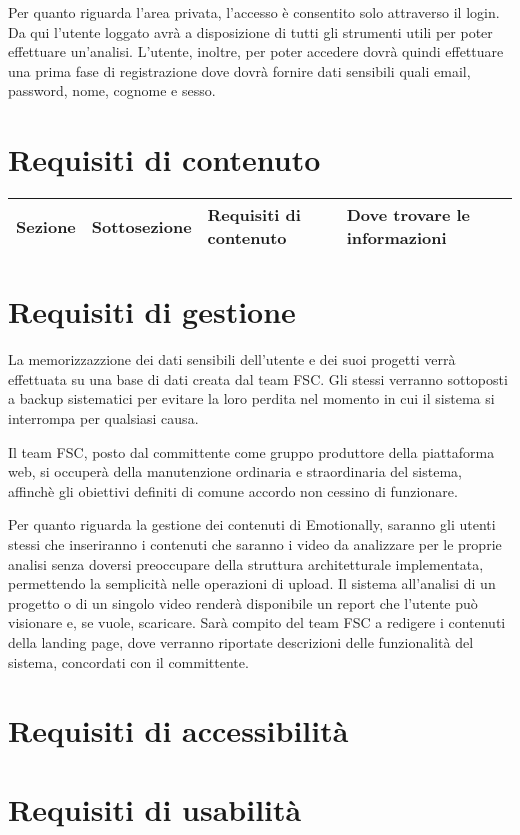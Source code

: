 Per quanto riguarda l'area privata, l'accesso è consentito solo attraverso il 
login. Da qui l'utente loggato avrà a disposizione di tutti gli strumenti utili 
per poter effettuare un'analisi. L'utente, inoltre, per poter accedere dovrà 
quindi effettuare una prima fase di registrazione dove dovrà fornire dati 
sensibili quali email, password, nome, cognome e sesso.

\section{Requisiti di contenuto}\label{sec:requisiti-di-contenuto}

\begin{table}[H]
	\centering
	\caption{I bisogni degli utenti di Emotionally.}
	\label{tab:bisogni-utenti}
	\begin{longtable}{@{}|>{\centering\arraybackslash}m{}|m{}|m{}|>{\centering\arraybackslash}m{}|@{}}
		\hline
		\rowcolor{emotionally-color}
		{\color{white} \textbf{Sezione}}   & {\color{white} 
		\textbf{Sottosezione}}     & {\color{white} \textbf{Requisiti di 
		contenuto}} & {\color{white} \textbf{Dove trovare le informazioni}} 
		\\\hline
		\endfirsthead
		\hline
	\end{longtable}
\end{table}

\section{Requisiti di gestione}\label{sec:requisiti-di-gestione}
La memorizzazzione dei dati sensibili dell'utente e dei suoi progetti verrà 
effettuata su una base di dati creata dal team FSC. Gli stessi verranno 
sottoposti a backup sistematici per evitare la loro perdita nel momento in cui 
il sistema si interrompa per qualsiasi causa.

Il team FSC, posto dal committente come gruppo produttore della piattaforma 
web, si occuperà della manutenzione ordinaria e straordinaria del sistema, 
affinchè gli obiettivi definiti di comune accordo non cessino di funzionare.

Per quanto riguarda la gestione dei contenuti di Emotionally, saranno gli 
utenti stessi che inseriranno i contenuti che saranno i video da analizzare per 
le proprie analisi senza doversi preoccupare della struttura architetturale 
implementata, permettendo la semplicità nelle operazioni di upload. Il sistema 
all'analisi di un progetto o di un singolo video renderà disponibile un report 
che l'utente può visionare e, se vuole, scaricare. 
Sarà compito del team FSC a redigere i contenuti della landing page, dove 
verranno riportate descrizioni delle funzionalità del sistema, concordati con 
il committente.

\section{Requisiti di accessibilità}\label{sec:requisiti-di-accessibilita}

\section{Requisiti di usabilità}\label{sec:requisiti-di-usabilita}
